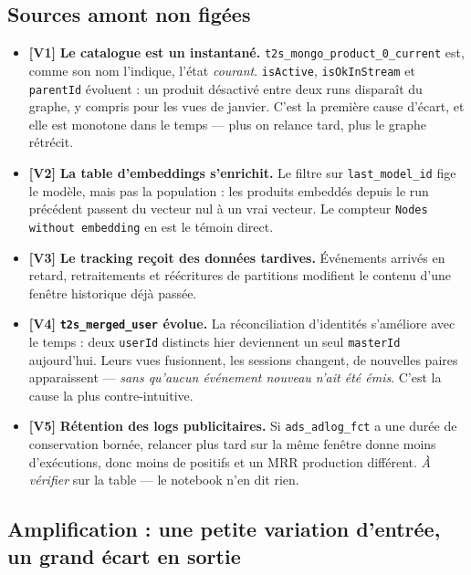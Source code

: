 \documentclass[11pt,a4paper]{article}
\newcommand{\code}[1]{\texttt{\small #1}}
\newcommand{\hyp}[1]{\textcolor{hypcol}{\textbf{\small [#1]}}}
\begin{document}
\subsection{Sources amont non figées}

\begin{itemize}[leftmargin=*]
  \item \hyp{V1} \textbf{Le catalogue est un instantané.}
        \code{t2s\_mongo\_product\_0\_current} est, comme son nom l'indique, l'état
        \emph{courant}. \code{isActive}, \code{isOkInStream} et \code{parentId}
        évoluent : un produit désactivé entre deux runs disparaît du graphe, y
        compris pour les vues de janvier. C'est la première cause d'écart, et elle
        est monotone dans le temps --- plus on relance tard, plus le graphe rétrécit.
  \item \hyp{V2} \textbf{La table d'embeddings s'enrichit.} Le filtre sur
        \code{last\_model\_id} fige le modèle, mais pas la population : les produits
        embeddés depuis le run précédent passent du vecteur nul à un vrai vecteur.
        Le compteur \code{Nodes without embedding} en est le témoin direct.
  \item \hyp{V3} \textbf{Le tracking reçoit des données tardives.} Événements
        arrivés en retard, retraitements et réécritures de partitions modifient le
        contenu d'une fenêtre historique déjà passée.
  \item \hyp{V4} \textbf{\code{t2s\_merged\_user} évolue.} La réconciliation
        d'identités s'améliore avec le temps : deux \code{userId} distincts hier
        deviennent un seul \code{masterId} aujourd'hui. Leurs vues fusionnent, les
        sessions changent, de nouvelles paires apparaissent --- \emph{sans qu'aucun
        événement nouveau n'ait été émis}. C'est la cause la plus contre-intuitive.
  \item \hyp{V5} \textbf{Rétention des logs publicitaires.} Si
        \code{ads\_adlog\_fct} a une durée de conservation bornée, relancer plus tard
        sur la même fenêtre donne moins d'exécutions, donc moins de positifs et un
        MRR production différent. \emph{À vérifier} sur la table --- le notebook
        n'en dit rien.
\end{itemize}

\subsection{Amplification : une petite variation d'entrée, un grand écart en sortie}
\end{document}
